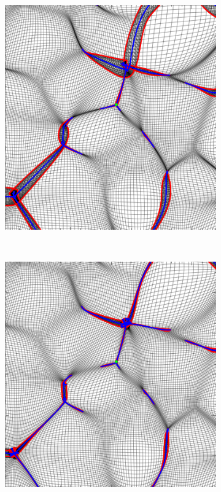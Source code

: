 \documentclass[a4paper, 11pt]{article}
\begin{document}
\begin{figure}
\begin{subfigure}[b]{0.28\textwidth}
\end{subfigure}~
\begin{subfigure}[b]{0.28\textwidth}
\includegraphics[width=\textwidth]{Hyperbolic_Z}
\end{subfigure}~
\begin{subfigure}[b]{0.28\textwidth}
\includegraphics[width=\textwidth]{Hyperbolic_Nb}

\end{subfigure}
\end{figure}
\end{document}
